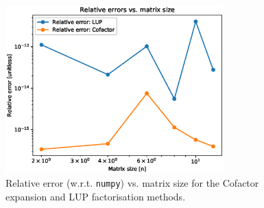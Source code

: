 \documentclass[11pt, oneside]{article}
\begin{document}
\begin{figure}[]
      \centering
      \includegraphics[width=0.75\textwidth]{figure/Figure_3.eps}
      \caption{Relative error (w.r.t. \texttt{numpy})  vs. matrix size for the Cofactor expansion and LUP factorisation methods.}
      \label{fig:3}
\end{figure}
\end{document}
